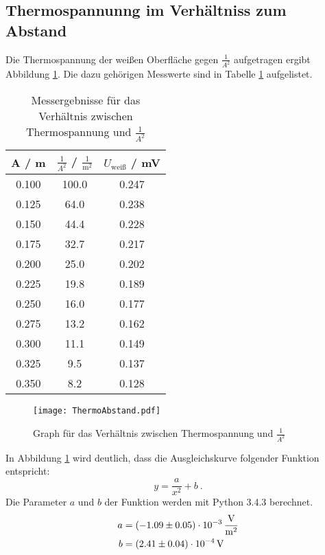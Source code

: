\subsection{Thermospannunng im Verhältniss zum Abstand}
Die Thermospannung der weißen Oberfläche gegen $\frac{1}{A^2}$ aufgetragen ergibt Abbildung \ref{fig:Abstand}. Die dazu gehörigen Messwerte sind in Tabelle \ref{tab:Abstand} aufgelistet.
\begin{table}[H]
  \centering
  \begin{tabular}{c c c}
      A / m & $\frac{1}{A^2}$ / $\frac{1}{\text{m}^2}$ & $U_\text{weiß}$ / mV \\
    \midrule
      0.100  & 100.0 & 0.247 \\
      0.125	& 64.0   & 0.238 \\
      0.150	& 44.4   & 0.228 \\
      0.175	& 32.7   & 0.217 \\
      0.200	& 25.0   & 0.202 \\
      0.225	& 19.8   & 0.189 \\
      0.250	& 16.0   & 0.177 \\
      0.275	& 13.2   & 0.162 \\
      0.300	& 11.1   & 0.149 \\
      0.325	& 9.5    & 0.137 \\
      0.350	& 8.2    & 0.128 \\
  \end{tabular}
  \caption{Messergebnisse für das Verhältnis zwischen Thermospannung und $\frac{1}{A^2}$}
  \label{tab:Abstand}
\end{table}

\begin{figure}[H]
  \centering
  \texttt{[image: ThermoAbstand.pdf]}
  \caption{Graph für das Verhältnis zwischen Thermospannung und $\frac{1}{A^2}$}
  \label{fig:Abstand}
\end{figure}
In Abbildung \ref{tab:Abstand} wird deutlich, dass die Ausgleichskurve folgender Funktion entspricht:
\begin{equation}
  y = \frac{a}{x^2} + b \ .
\end{equation}
Die Parameter $a$ und $b$ der Funktion werden mit Python 3.4.3 berechnet.
\begin{align}
  a &= (\num{-1.09 +- 0.05}) \cdot 10^{-3} \, \frac{\text{V}}{\text{m}^2} \\
  b &= (\num{2.41 +- 0.04}) \cdot 10^{-4} \, \text{V}
\end{align}
